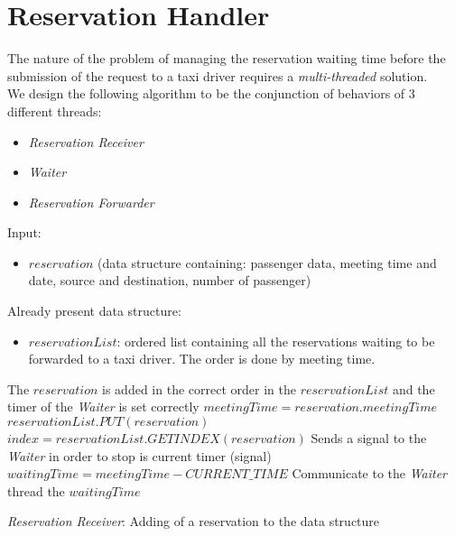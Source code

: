 

\section{Reservation Handler}\label{alg:reservationHandler}
The nature of the problem of managing the reservation waiting time before the submission of the request to a taxi driver requires a \textit{multi-threaded} solution.\\
We design the following algorithm to be the conjunction of behaviors of 3 different threads:
\begin{itemize}
	\item \textit{Reservation Receiver}
	\item \textit{Waiter}
	\item \textit{Reservation Forwarder}
\end{itemize}
\begin{algorithm}
\begin{algorithmic}
\REQUIRE Input: 
	\begin{itemize}
		\item $reservation$ (data structure containing: passenger data, meeting time and date, source and destination, number of passenger)
	\end{itemize}
Already present data structure:
\begin{itemize}
	\item $reservationList$: ordered list containing all the reservations waiting to be forwarded to a taxi driver. The order is done by meeting time.
\end{itemize}
\ENSURE The $reservation$ is added in the correct order in the $reservationList$ and the timer of the \textit{Waiter} is set correctly
\STATE $meetingTime = reservation.meetingTime$
\STATE $reservationList.PUT(reservation)$  
\STATE $index = reservationList.GETINDEX(reservation)$
	\STATE Sends a signal to the \textit{Waiter} in order to stop is current timer (signal)
	\STATE $waitingTime=meetingTime - CURRENT\_TIME$
	\STATE Communicate to the \textit{Waiter} thread the $waitingTime$
\ENDIF
\end{algorithmic}
\caption{\textit{Reservation Receiver}: Adding of a reservation to the data structure}
\end{algorithm}
